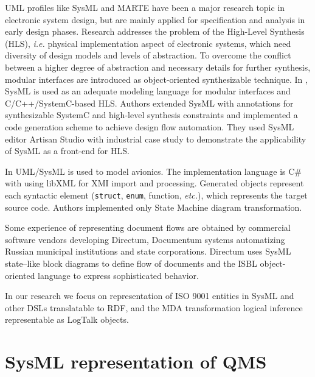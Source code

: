 \documentclass[12pt,a4paper]{llncs}
\begin{document}
UML profiles like SysML and MARTE have been a major research topic in electronic system design, but are mainly applied for specification and analysis in early design phases.  Research \cite{mish} addresses the problem of the High-Level Synthesis (HLS), \emph{i.e.} physical implementation aspect of electronic systems, which need diversity of design models and levels of abstraction.  To overcome the conflict between a higher degree of abstraction and necessary details for further synthesis, modular interfaces are introduced as object-oriented synthesizable technique. In \cite{mish}, SysML is used as an adequate modeling language for modular interfaces and C/C++/SystemC-based HLS. Authors extended SysML with annotations for synthesizable SystemC and high-level synthesis constraints and implemented a code generation scheme to achieve design flow automation. They used SysML editor Artisan Studio with industrial case study to demonstrate the applicability of SysML as a front-end for HLS.

In \cite{tom16} UML/SysML is used to model avionics.  The implementation language is C\# with using libXML for XMI import and processing.  Generated objects represent each syntactic element (\texttt{struct}, \texttt{enum}, function, \emph{etc.}), which represents the target source code.  Authors implemented only State Machine diagram transformation.


Some experience of representing document flows are obtained by commercial software vendors developing Directum, Documentum systems automatizing Russian municipal institutions and state corporations.  Directum uses SysML state--like block diagrams to define flow of documents and the ISBL object-oriented language to express sophisticated behavior.


In our research we focus on representation of ISO 9001 entities in SysML and other DSLs translatable to RDF, and the MDA transformation logical inference representable as LogTalk objects.

\section{SysML representation of QMS}
\end{document}
